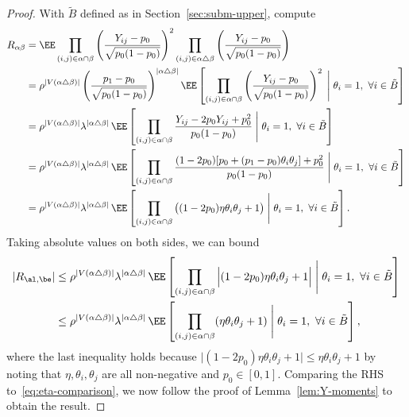 \documentclass[11pt]{article}
\begin{document}
\begin{proof}
With $\tilde{B}$ defined as in Section~\ref{sec:subm-upper}, compute
\begin{align*}
R_{\alpha\beta} &= \EE \prod_{(i,j) \in \alpha \cap \beta} \left(\frac{Y_{ij}-p_0}{\sqrt{p_0(1-p_0)}}\right)^2 \prod_{(i,j) \in \alpha \triangle \beta} \left(\frac{Y_{ij}-p_0}{\sqrt{p_0(1-p_0)}}\right) \\
&= \rho^{|V(\alpha \triangle \beta)|} \left(\frac{p_1-p_0}{\sqrt{p_0(1-p_0)}}\right)^{|\alpha \triangle \beta|} \EE \left[\prod_{(i,j) \in \alpha \cap \beta} \left(\frac{Y_{ij}-p_0}{\sqrt{p_0(1-p_0)}}\right)^2 \;\Bigg|\; \theta_i = 1,~\forall i \in \tilde{B}\right] \\
&= \rho^{|V(\alpha \triangle \beta)|} \lambda^{|\alpha \triangle \beta|} \, \EE \left[\prod_{(i,j) \in \alpha \cap \beta} \frac{Y_{ij} - 2 p_0 Y_{ij} + p_0^2}{p_0(1-p_0)} \;\Bigg|\; \theta_i = 1,~\forall i \in \tilde{B}\right] \\
&= \rho^{|V(\alpha \triangle \beta)|} \lambda^{|\alpha \triangle \beta|} \, \EE \left[\prod_{(i,j) \in \alpha \cap \beta} \frac{(1 - 2 p_0)[p_0 + (p_1-p_0)\theta_i\theta_j] + p_0^2}{p_0(1-p_0)} \;\Bigg|\; \theta_i = 1,~\forall i \in \tilde{B}\right] \\
&= \rho^{|V(\alpha \triangle \beta)|} \lambda^{|\alpha \triangle \beta|} \, \EE \left[\prod_{(i,j) \in \alpha \cap \beta} \big((1-2p_0)\eta \theta_i \theta_j + 1\big) \;\Bigg|\; \theta_i = 1,~\forall i \in \tilde{B}\right].
\end{align*}
Taking absolute values on both sides, we can bound
\[
\begin{split}
|R_{\al,\be}|
&\leq \rho^{|V(\alpha \triangle \beta)|} \lambda^{|\alpha \triangle \beta|} \, \EE \left[\prod_{(i,j) \in \alpha \cap \beta} \Big|(1-2p_0)\eta \theta_i \theta_j + 1\Big|\;\Bigg|\; \theta_i = 1,~\forall i \in \tilde{B}\right]\\
&\leq \rho^{|V(\alpha \triangle \beta)|} \lambda^{|\alpha \triangle \beta|} \, \EE \left[\prod_{(i,j) \in \alpha \cap \beta} (\eta \theta_i \theta_j + 1) \;\Bigg|\; \theta_i = 1,~\forall i \in \tilde{B}\right],
\end{split}
\]
where the last inequality holds because $\big|(1-2p_0)\eta \theta_i\theta_j+1\big|\leq \eta \theta_i\theta_j+1$ by noting that $\eta,\theta_i,\theta_j$ are all non-negative and $p_0\in [0,1]$. Comparing the RHS to~\eqref{eq:eta-comparison}, we now follow the proof of Lemma~\ref{lem:Y-moments} to obtain the result.
\end{proof}
\end{document}
